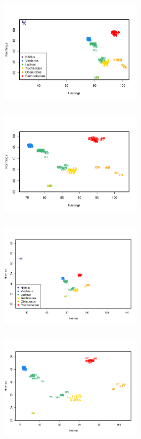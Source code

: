 \documentclass[10pt,letterpaper]{article}
\begin{document}
\begin{figure}
	\centering
			{\includegraphics[width=2.8in,height=2.3in]{../figs/warblers/warb_ind_noad.pdf}}
			{\includegraphics[width=2.8in,height=2.3in]{../figs/warblers/warb_ind_noad_closeup.pdf}}
			{\includegraphics[width=2.8in,height=2.3in]{../figs/warblers/individual_warbler_map_arrows_randpr1.pdf}}
			{\includegraphics[width=2.8in,height=2.3in]{../figs/warblers/individual_warbler_map_arrows_randpr1_closeup.pdf}}

\end{figure}
\end{document}

